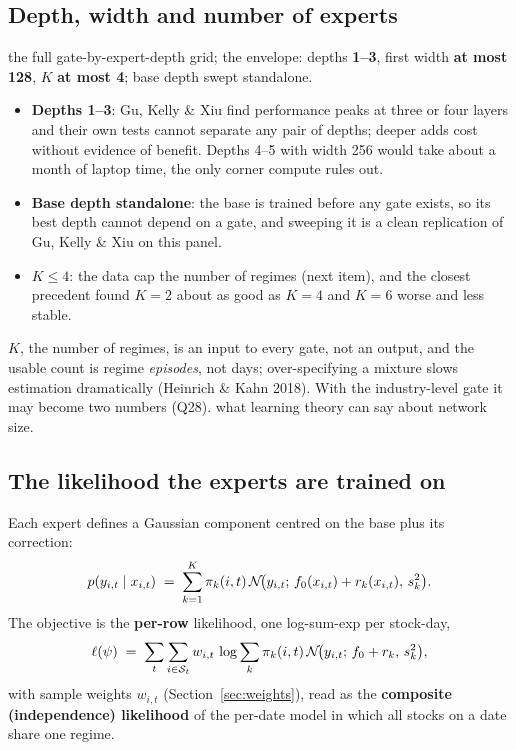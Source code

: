 \subsection{Depth, width and number of experts}

 the full gate-by-expert-depth grid;  the envelope: depths
\textbf{1--3}, first width \textbf{at most 128}, $K$ \textbf{at most 4}; base depth swept standalone.

\begin{whybox}
\begin{itemize}
\item \textbf{Depths 1--3}: Gu, Kelly \& Xiu find performance peaks at three or four layers and their own
  tests cannot separate any pair of depths; deeper adds cost without evidence of benefit. Depths 4--5
  with width 256 would take about a month of laptop time, the only corner compute rules out.
\item \textbf{Base depth standalone}: the base is trained before any gate exists, so its best depth cannot
  depend on a gate, and sweeping it is a clean replication of Gu, Kelly \& Xiu on this panel.
\item \textbf{$K\le4$}: the data cap the number of regimes (next item), and the closest precedent found
  $K=2$ about as good as $K=4$ and $K=6$ worse and less stable.
\end{itemize}
\end{whybox}

 \textbf{$K$}, the number of regimes, is an input to every gate, not an output, and the usable
count is regime \emph{episodes}, not days; over-specifying a mixture slows estimation dramatically
(Heinrich \& Kahn 2018). With the industry-level gate it may become two numbers (Q28).  what
learning theory can say about network size.

\subsection{The likelihood the experts are trained on}

Each expert defines a Gaussian component centred on the base plus its correction:
\begin{equation}
p(y_{i,t}\mid x_{i,t}) \;=\; \sum_{k=1}^{K}\pi_k(i,t)\,\mathcal{N}\!\big(y_{i,t};\,f_0(x_{i,t})+r_k(x_{i,t}),\,s_k^2\big).
\end{equation}
 The objective is the \textbf{per-row} likelihood, one log-sum-exp per stock-day,
\begin{equation}
\ell(\psi) \;=\; \sum_{t}\sum_{i\in\mathcal S_t} w_{i,t}\,\log\sum_{k}\pi_k(i,t)\,
\mathcal{N}\!\big(y_{i,t};\,f_0+r_k,\,s_k^2\big),
\end{equation}
with sample weights $w_{i,t}$ (Section~\ref{sec:weights}), read as the \textbf{composite (independence)
likelihood} of the per-date model in which all stocks on a date share one regime.

